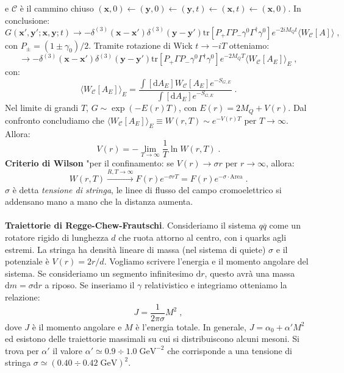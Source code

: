 \documentclass[12pt,a4paper]{article}
\theoremstyle{definition}
\newcommand{\diff}[1][]{\mathrm{d}#1}
\newcommand{\bra}{\langle}
\newcommand{\ket}{\rangle}
\newcommand{\adj}[1]{#1^{\dagger}}
\newcommand{\tr}{\mathrm{tr}}
\numberwithin{equation}{section}
\begin{document}
e $\mathcal{C}$ è il cammino chiuso $(\mathbf{x},0)\leftarrow(\mathbf{y},0)\leftarrow(\mathbf{y},t)\leftarrow(\mathbf{x},t)\leftarrow(\mathbf{x},0)$. In conclusione:
\begin{equation}
G(\mathbf{x}',\mathbf{y}';\mathbf{x},\mathbf{y};t)\to -\delta^{(3)}(\mathbf{x}-\mathbf{x}')\delta^{(3)}(\mathbf{y}-\mathbf{y}')\tr[P_+\Gamma P_-\gamma^0\adj{\Gamma}\gamma^0]e^{-2iM_Qt}\bra W_{\mathcal{C}}[A]\ket\;,
\end{equation}
con $P_{\pm}=(1\pm \gamma_0)/2$. Tramite rotazione di Wick $t\to -iT$ otteniamo:
\begin{equation}
\to -\delta^{(3)}(\mathbf{x}-\mathbf{x}')\delta^{(3)}(\mathbf{y}-\mathbf{y}')\tr[P_+\Gamma P_-\gamma^0\adj{\Gamma}\gamma^0]e^{-2M_QT}\bra W_{\mathcal{C}}[A_E]\ket_E\;,
\end{equation}
con:
$$
\bra W_{\mathcal{C}}[A_E]\ket_E=\frac{\int[\diff{A_E}]W_{\mathcal{C}}[A_E]e^{-S_{G,E}}}{\int[\diff{A_E}]e^{-S_{G,E}}}\;.
$$
Nel limite di grandi $T$, $G\sim \exp(-E(r)T)$, con $E(r)=2M_Q+V(r)$. Dal confronto concludiamo che $\bra W_{\mathcal{C}}[A_E]\ket_E\equiv W(r,T)\sim e^{-V(r)T}$ per $T\to\infty$. Allora:
\begin{equation}
V(r)=-\lim_{T\to\infty}\frac{1}{T}\ln W(r,T)\;.
\end{equation}
\textbf{Criterio di Wilson} "per il confinamento: se $V(r)\to \sigma r$ per $r\to\infty$, allora:
$$
W(r,T)\stackrel{R,T\to\infty}{\longrightarrow} F(r)e^{-\sigma rT}=F(r)e^{-\sigma\cdot\mathrm{Area}}\;.
$$
$\sigma$ è detta \emph{tensione di stringa}, le linee di flusso del campo cromoelettrico si addensano mano a mano che la distanza aumenta. \\
\\
\textbf{Traiettorie di Regge-Chew-Frautschi}. Consideriamo il sistema $q\overline{q}$ come un rotatore rigido di lunghezza $d$ che ruota attorno al centro, con i quarks agli estremi. La stringa ha densità lineare di massa (nel sistema di quiete) $\sigma$ e il potenziale è $V(r)=2r/d$. Vogliamo scrivere l'energia e il momento angolare del sistema. Se consideriamo un segmento infinitesimo $\diff{r}$, questo avrà una massa $\diff{m}=\sigma\diff{r}$ a riposo. Se inseriamo il $\gamma$ relativistico e integriamo otteniamo la relazione:
\begin{equation}
J=\frac{1}{2\pi\sigma}M^2\;,
\end{equation}
dove $J$ è il momento angolare e $M$ è l'energia totale. In generale, $J=\alpha_0+\alpha' M^2$ ed esistono delle traiettorie massimali su cui si distribuiscono alcuni mesoni. Si trova per $\alpha'$ il valore $\alpha'\simeq 0.9\div 1.0\; \mathrm{GeV}^{-2}$ che corrisponde a una tensione di stringa $\sigma\simeq (0.40\div 0.42\;\mathrm{GeV})^2$.
\cleardoublepage
\end{document}
